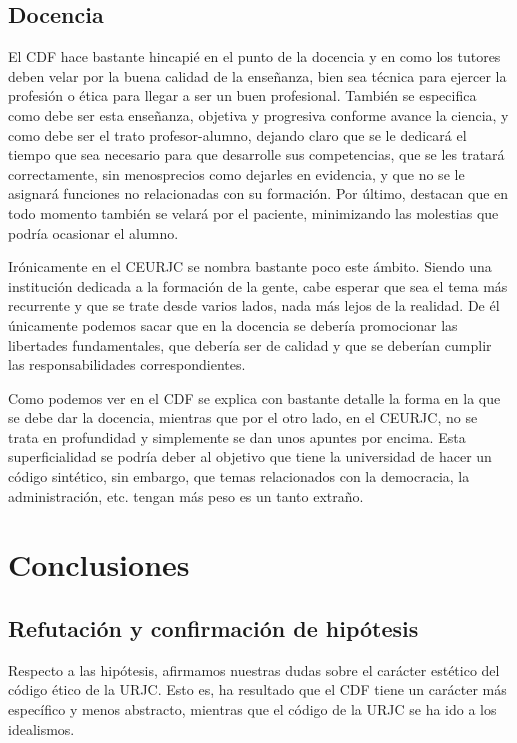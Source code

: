 \documentclass[11pt,a4paper]{article}
\begin{document}
\subsection{Docencia}
El CDF hace bastante hincapié en el punto de la docencia y en como los tutores deben velar por la buena calidad de la enseñanza, bien sea técnica para ejercer la profesión o ética para llegar a ser un buen profesional. También se especifica como debe ser esta enseñanza, objetiva y progresiva conforme avance la ciencia, y como debe ser el trato profesor-alumno, dejando claro que se le dedicará el tiempo que sea necesario para que desarrolle sus competencias, que se les tratará correctamente, sin menosprecios como dejarles en evidencia, y que no se le asignará funciones no relacionadas con su formación. Por último, destacan que en todo momento también se velará por el paciente, minimizando las molestias que podría ocasionar el alumno. 

Irónicamente en el CEURJC se nombra bastante poco este ámbito. Siendo una institución dedicada a la formación de la gente, cabe esperar que sea el tema más recurrente y que se trate desde varios lados, nada más lejos de la realidad. De él únicamente podemos sacar que en la docencia se debería promocionar las libertades fundamentales, que debería ser de calidad y que se deberían cumplir las responsabilidades correspondientes.

Como podemos ver en el CDF se explica con bastante detalle la forma en la que se debe dar la docencia, mientras que por el otro lado, en el CEURJC, no se trata en profundidad y simplemente se dan unos apuntes por encima. Esta superficialidad se podría deber al objetivo que tiene la universidad de hacer un código sintético, sin embargo, que temas relacionados con la democracia, la administración, etc. tengan más peso es un tanto extraño.



\section{Conclusiones}
\subsection{Refutación y confirmación de hipótesis}
Respecto a las hipótesis, afirmamos nuestras dudas sobre el carácter estético del código ético de la URJC. Esto es, ha resultado que el CDF tiene un carácter más específico y menos abstracto, mientras que el código de la URJC se ha ido a los idealismos. 
\end{document}
